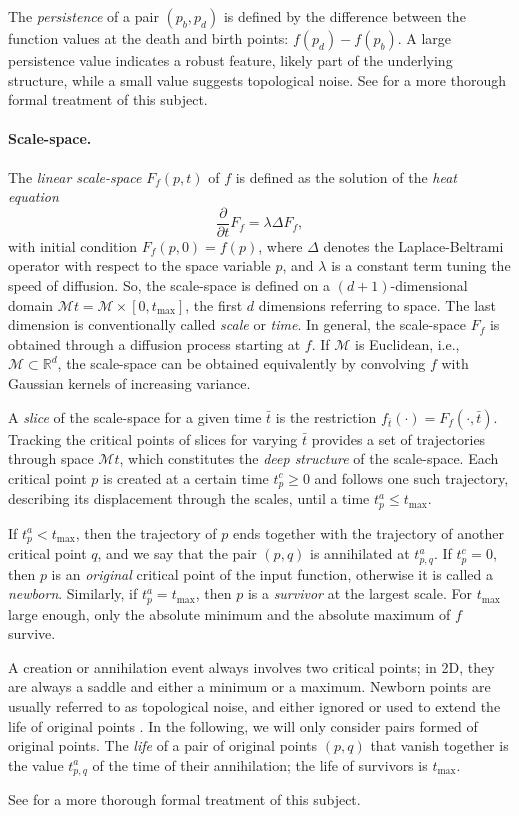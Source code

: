 The \emph{persistence} of a pair $(p_b,p_d)$ is defined by the difference between the function values at the death and birth points: $f(p_d)-f(p_b)$.
A large persistence value indicates a robust feature, likely part of the underlying structure, while a small value suggests topological noise.
See \cite{Edelsbrunner:2010} for a more thorough formal treatment of this subject. 

 
\paragraph*{Scale-space.}
The \emph{linear scale-space} $F_f(p,t)$ of $f$ is defined as the solution of the \emph{heat equation} 
\[\frac{\partial}{\partial t} F_f = \lambda \Delta F_f,\]
with initial condition $F_f(p,0)=f(p)$, where $\Delta$ denotes the Laplace-Beltrami operator with respect to the space variable $p$, and $\lambda$ is a constant term tuning the speed of diffusion.
So, the scale-space is defined on a $(d+1)$-dimensional domain ${\mathcal M}t={\mathcal M}\times [0,t_{\max}]$, the first $d$ dimensions referring to space. 
The last dimension is conventionally called \emph{scale} or \emph{time}.
In general, the scale-space $F_f$ is obtained through a diffusion process starting at $f$.
If ${\mathcal M}$ is Euclidean, i.e., ${\mathcal M}\subset\mathbb{R}^d$, the scale-space can be obtained equivalently by convolving $f$ with Gaussian kernels of increasing variance. 

A \emph{slice} of the scale-space for a given time $\bar{t}$ is the restriction $f_{\bar t}(\cdot)=F_f(\cdot,\bar t)$.
Tracking the critical points of slices for varying $\bar t$ provides a set of trajectories through space ${\mathcal M}t$, which constitutes the \emph{deep structure} of the scale-space.
Each critical point $p$ is created at a certain time $t^c_p\geq 0$ and follows one such trajectory, describing its displacement through the scales, until a time $t^a_p\leq t_{\max}$.  

If $t^a_p<t_{\max}$, then the trajectory of $p$ ends together with the trajectory of another critical point $q$, and we say that the pair $(p,q)$ is annihilated at $t^a_{p,q}$. 
If $t^c_p=0$, then $p$ is an \emph{original} critical point of the input function, otherwise it is called a \emph{newborn}. 
Similarly, if $t^a_p=t_{\max}$, then $p$ is a \emph{survivor} at the largest scale.
For $t_{\max}$ large enough, only the absolute minimum and the absolute maximum of $f$ survive. 

A creation or annihilation event always involves two critical points; in 2D, they are always a saddle and either a minimum or a maximum.
Newborn points are usually referred to as topological noise, and either ignored or used to extend the life of original points \cite{Rocca:2013}.
In the following, we will only consider pairs formed of original points.
The \emph{life} of a pair of original points $(p,q)$ that vanish together is the value $t^a_{p,q}$ of the time of their annihilation; the life of survivors is $t_{\max}$.
 
See \cite{Florack:2000wg} for a more thorough formal treatment of this subject. 


